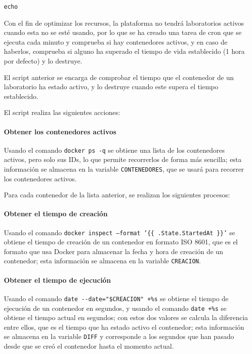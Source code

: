 \begin{appendices}
\begin{lstlisting}[style=bash_style, basicstyle=\ttfamily\scriptsize]
    echo
            \end{lstlisting}
        
            \newpage

            Con el fin de optimizar los recursos, la plataforma no tendrá laboratorios activos cuando esta no se esté usando, por lo que se ha creado una tarea de cron que se ejecuta cada minuto y comprueba si hay contenedores activos, y en caso de haberlos, comprueba si alguno ha superado el tiempo de vida establecido (1 hora por defecto) y lo destruye.

            El script anterior se encarga de comprobar el tiempo que el contenedor de un laboratorio ha estado activo, y lo destruye cuando este supera el tiempo establecido.
            
            El script realiza las siguientes acciones:

            \paragraph{Obtener los contenedores activos}
            
                Usando el comando \texttt{docker ps -q} se obtiene una lista de los contenedores activos, pero solo sus IDs, lo que permite recorrerlos de forma más sencilla; esta información se almacena en la variable \texttt{CONTENEDORES}, que se usará para recorrer los contenedores activos.

            Para cada contenedor de la lista anterior, se realizan los siguientes procesos:

            \paragraph{Obtener el tiempo de creación}
            
                Usando el comando \texttt{docker inspect --format '\{\{ .State.StartedAt \}\}'} se obtiene el tiempo de creación de un contenedor en formato ISO 8601, que es el formato que usa Docker para almacenar la fecha y hora de creación de un contenedor; esta información se almacena en la variable \texttt{CREACION}.

            \paragraph{Obtener el tiempo de ejecución}
            
                Usando el comando \verb|date --date="$CREACION" +%s| se obtiene el tiempo de ejecución de un contenedor en segundos, y usando el comando \verb|date +%s| se obtiene el tiempo actual en segundos; con estos dos valores se calcula la diferencia entre ellos, que es el tiempo que ha estado activo el contenedor; esta información se almacena en la variable \texttt{DIFF} y corresponde a los segundos que han pasado desde que se creó el contenedor hasta el momento actual.


\end{appendices}
